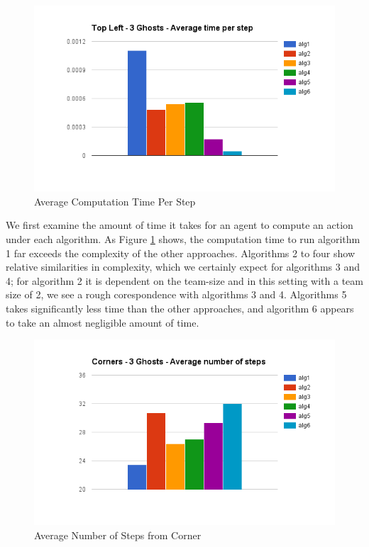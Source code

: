 \documentclass[11pt]{article}
\begin{document}
\begin{multicols}{2}
\begin{figure}[H]
	\includegraphics[width=\columnwidth]{time.png}
	\caption{Average Computation Time Per Step}
	\label{fig:averagecomputation}
\end{figure}	

We first examine the amount of time it takes for an agent to compute an action under each algorithm. As Figure \ref{fig:averagecomputation} shows, the computation time to run algorithm 1 far exceeds the complexity of the other approaches. Algorithms 2 to four show relative similarities in complexity, which we certainly expect for algorithms 3 and 4; for algorithm 2 it is dependent on the team-size and in this setting with a team size of 2, we see a rough corespondence with algorithms 3 and 4. Algorithms 5 takes significantly less time than the other approaches, and algorithm 6 appears to take an almost negligible amount of time. 

\begin{figure}[H]
	\includegraphics[width=\columnwidth]{cornersteps.png}
	\caption{Average Number of Steps from Corner}
	\label{fig:averagenumstepscorner}
\end{figure}


\end{multicols}
\end{document}

